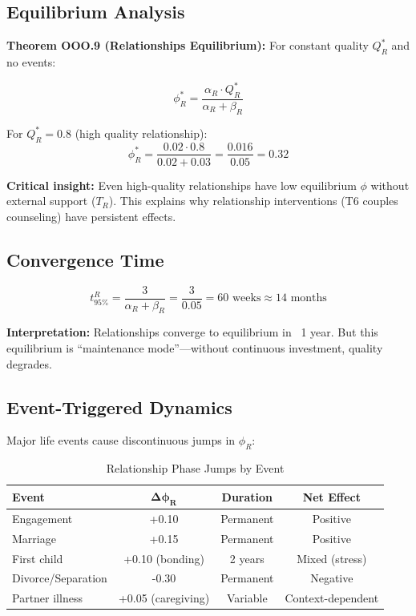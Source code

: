 \subsection{Equilibrium Analysis}

\textbf{Theorem OOO.9 (Relationships Equilibrium):} For constant quality $Q^*_R$ and no events:

\begin{equation}
\phi^*_R = \frac{\alpha_R \cdot Q^*_R}{\alpha_R + \beta_R}
\end{equation}

For $Q^*_R = 0.8$ (high quality relationship):
\begin{equation}
\phi^*_R = \frac{0.02 \cdot 0.8}{0.02 + 0.03} = \frac{0.016}{0.05} = 0.32
\end{equation}

\textbf{Critical insight:} Even high-quality relationships have low equilibrium $\phi$ without
external support ($T_R$). This explains why relationship interventions (T6 couples counseling)
have persistent effects.

\subsection{Convergence Time}

\begin{equation}
t_{95\%}^R = \frac{3}{\alpha_R + \beta_R} = \frac{3}{0.05} = 60 \text{ weeks} \approx 14 \text{ months}
\end{equation}

\textbf{Interpretation:} Relationships converge to equilibrium in ~1 year. But this equilibrium
is ``maintenance mode''---without continuous investment, quality degrades.

\subsection{Event-Triggered Dynamics}

Major life events cause discontinuous jumps in $\phi_R$:

\begin{table}[htbp]
\centering
\caption{Relationship Phase Jumps by Event}
\label{tab:ooo-rel-events}
\renewcommand{\arraystretch}{1.2}
\small
\begin{tabular}{@{}lccc@{}}
\toprule
\textbf{Event} & $\boldsymbol{\Delta\phi_R}$ & \textbf{Duration} & \textbf{Net Effect} \\
\midrule
Engagement & +0.10 & Permanent & Positive \\
Marriage & +0.15 & Permanent & Positive \\
First child & +0.10 (bonding) & 2 years & Mixed (stress) \\
Divorce/Separation & -0.30 & Permanent & Negative \\
Partner illness & +0.05 (caregiving) & Variable & Context-dependent \\
\bottomrule
\end{tabular}
\end{table}

